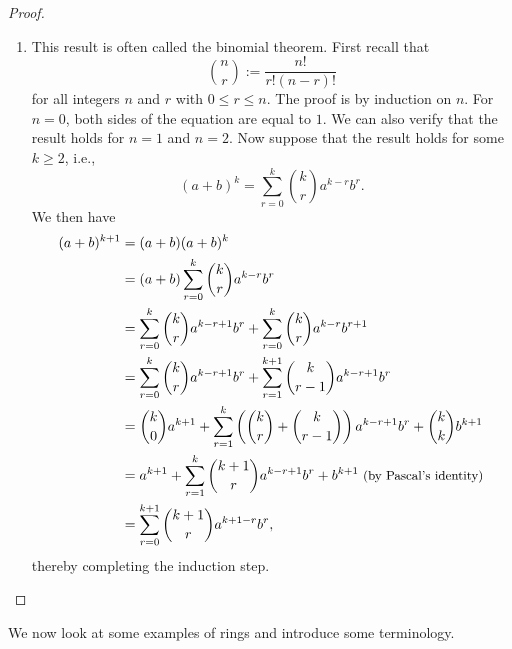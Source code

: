 \begin{proof}
\begin{enumerate}[label=(\alph*), wide]
        \item This result is often called the binomial theorem. First recall
        that
        \[
            \binom{n}{r} := \frac{n!}{r!(n-r)!}
        \]
        for all integers \(n\) and \(r\) with \(0 \leq r \leq n\). The proof is
        by induction on \(n\). For \(n = 0\), both sides of the equation are
        equal to \(1\). We can also verify that the result holds for \(n = 1\)
        and \(n = 2\). Now suppose that the result holds for some \(k \geq 2\),
        i.e.,
        \[
            (a + b)^k = \sum_{r = 0}^{k} \binom{k}{r} a^{k-r} b^r.
        \]
        We then have
        \begin{align*}
            (a + b)^{k+1} &= (a + b)(a + b)^k\\
            &= (a + b)\sum_{r = 0}^{k} \binom{k}{r} a^{k-r} b^r\\
            &= \sum_{r = 0}^{k} \binom{k}{r} a^{k-r+1} b^r + \sum_{r = 0}^{k} \binom{k}{r} a^{k-r} b^{r+1}\\
            &= \sum_{r = 0}^{k} \binom{k}{r} a^{k-r+1} b^r + \sum_{r = 1}^{k+1} \binom{k}{r-1} a^{k-r+1} b^r\\
            &= \binom{k}{0} a^{k+1} + \sum_{r = 1}^{k} \left(\binom{k}{r} + \binom{k}{r-1}\right) a^{k-r+1} b^r + \binom{k}{k} b^{k+1}\\
            &= a^{k+1} + \sum_{r = 1}^{k} \binom{k+1}{r} a^{k-r+1} b^r + b^{k+1} {\small \text{  (by Pascal's identity)}}\\
            &= \sum_{r = 0}^{k+1} \binom{k+1}{r} a^{k+1-r} b^r,
        \end{align*}
        thereby completing the induction step.
    \end{enumerate}
\end{proof}

We now look at some examples of rings and introduce some terminology.

